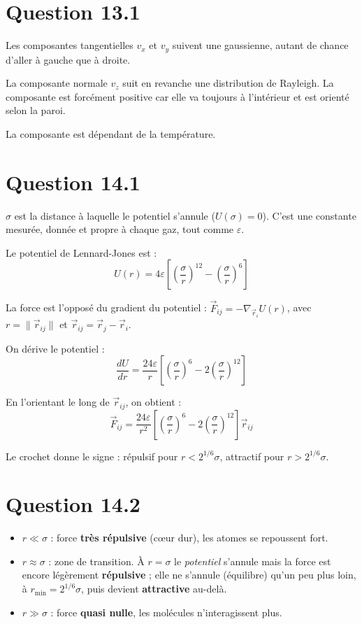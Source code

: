 \documentclass[a4paper]{article}
\begin{document}
\section*{Question 13.1}
    Les composantes tangentielles $v_x$ et $v_y$ suivent une gaussienne, autant de chance d'aller à gauche que à droite.

    La composante normale $v_z$ suit en revanche une distribution de Rayleigh.
    La composante est forcément positive car elle va toujours à l'intérieur et est orienté selon la paroi.

    La composante est dépendant de la température.
  
\section*{Question 14.1}
    $\sigma$ est la distance à laquelle le potentiel s'annule ($U(\sigma) = 0$).
    C'est une constante mesurée, donnée et propre à chaque gaz, tout comme $\varepsilon$.


    Le potentiel de Lennard-Jones est :
    $$U(r) = 4\varepsilon \left[ \left(\frac{\sigma}{r}\right)^{12} - \left(\frac{\sigma}{r}\right)^{6} \right]$$

    La force est l'opposé du gradient du potentiel : $\vec{F}_{ij} = -\nabla_{\vec{r}_i} U(r)$, avec $r = \|\vec{r}_{ij}\|$ et $\vec{r}_{ij} = \vec{r}_j - \vec{r}_i$.

    On dérive le potentiel :
    $$\frac{dU}{dr} = \frac{24\varepsilon}{r} \left[ \left(\frac{\sigma}{r}\right)^6 - 2\left(\frac{\sigma}{r}\right)^{12} \right]$$

    En l'orientant le long de $\vec{r}_{ij}$, on obtient :
    $$\vec{F}_{ij} = \frac{24\varepsilon}{r^2} \left[ \left(\frac{\sigma}{r}\right)^6 - 2\left(\frac{\sigma}{r}\right)^{12} \right] \vec{r}_{ij}$$

    Le crochet donne le signe : répulsif pour $r < 2^{1/6}\sigma$, attractif pour $r > 2^{1/6}\sigma$.

\section*{Question 14.2}
    \begin{itemize}
        \item $r \ll \sigma$ : force \textbf{très répulsive} (cœur dur), les atomes se repoussent fort.
        \item $r \approx \sigma$ : zone de transition. À $r = \sigma$ le \emph{potentiel} s'annule mais la force est encore légèrement \textbf{répulsive} ; elle ne s'annule (équilibre) qu'un peu plus loin, à $r_{\min} = 2^{1/6}\sigma$, puis devient \textbf{attractive} au-delà.
        \item $r \gg \sigma$ : force \textbf{quasi nulle}, les molécules n'interagissent plus.
    \end{itemize}
\end{document}
